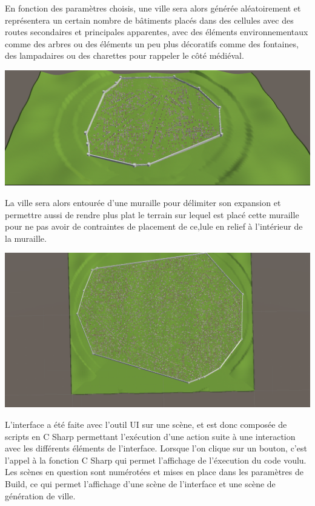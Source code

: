 En fonction des paramètres choisis, une ville sera alors générée aléatoirement et représentera un certain nombre de bâtiments placés dans des cellules avec des routes secondaires et principales apparentes, avec des éléments environnementaux comme des arbres ou des éléments un peu plus décoratifs comme des fontaines, des lampadaires ou des charettes pour rappeler le côté médiéval.

\begin{center}
	\centering
    \includegraphics[height = 5 cm]{images/Ville_1.png}\\
\end{center}

La ville sera alors entourée d'une muraille pour délimiter son expansion et permettre aussi de rendre plus plat le terrain sur lequel est placé cette muraille pour ne pas avoir de contraintes de placement de ce,lule en relief à l'intérieur de la muraille.

\begin{center}
	\centering
    \includegraphics[height = 5 cm]{images/Ville_2.png}\\
\end{center}

L’interface a été faite avec l’outil UI sur une scène, et est donc composée de scripts en C Sharp permettant l’exécution d’une action suite à une interaction avec les différents éléments de l’interface. Lorsque l'on clique sur un bouton, c'est l'appel à la fonction C Sharp qui permet l'affichage de l'éxecution du code voulu. Les scènes en question sont numérotées et mises en place dans les paramètres de Build, ce qui permet l'affichage d'une scène de l'interface et une scène de génération de ville. 

